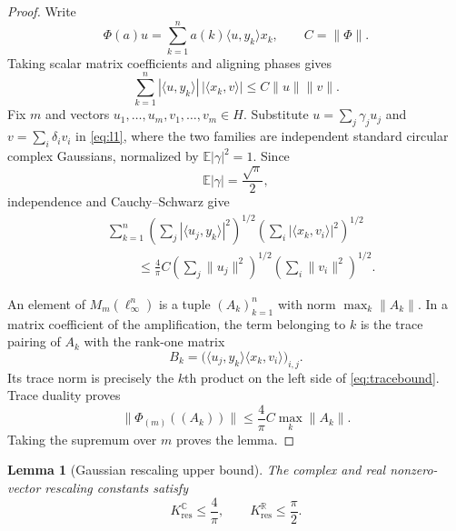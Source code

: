 \documentclass[11pt]{article}
\newtheorem{lemma}{Lemma}
\newcommand{\C}{\mathbb C}
\newcommand{\R}{\mathbb R}
\begin{document}
\begin{proof}
Write
\[
 \Phi(a)u=\sum_{k=1}^n a(k)\langle u,y_k\rangle x_k,
 \qquad C=\|\Phi\|.
\]
Taking scalar matrix coefficients and aligning phases gives
\begin{equation}\label{eq:l1}
 \sum_{k=1}^n
 |\langle u,y_k\rangle|\,|\langle x_k,v\rangle|
 \leq C\|u\|\|v\|.
\end{equation}
Fix $m$ and vectors $u_1,\ldots,u_m,v_1,\ldots,v_m\in H$.  Substitute
$u=\sum_j\gamma_ju_j$ and $v=\sum_i\delta_iv_i$ in \eqref{eq:l1}, where
the two families are independent standard circular complex Gaussians,
normalized by $\mathbb E|\gamma|^2=1$.  Since
\[
 \mathbb E|\gamma|=\frac{\sqrt\pi}{2},
\]
independence and Cauchy--Schwarz give
\begin{align}\label{eq:tracebound}
 &\sum_{k=1}^n
 \left(\sum_j|\langle u_j,y_k\rangle|^2\right)^{1/2}
 \left(\sum_i|\langle x_k,v_i\rangle|^2\right)^{1/2} \\
 &\hspace{1cm}\leq \frac4\pi C
 \left(\sum_j\|u_j\|^2\right)^{1/2}
 \left(\sum_i\|v_i\|^2\right)^{1/2}.
\end{align}

An element of $M_m(\ell_\infty^n)$ is a tuple $(A_k)_{k=1}^n$ with norm
$\max_k\|A_k\|$.  In a matrix coefficient of the amplification, the term
belonging to $k$ is the trace pairing of $A_k$ with the rank-one matrix
\[
 B_k=\big(\langle u_j,y_k\rangle\langle x_k,v_i\rangle\big)_{i,j}.
\]
Its trace norm is precisely the $k$th product on the left side of
\eqref{eq:tracebound}.  Trace duality proves
\[
 \|\Phi_{(m)}((A_k))\|\leq\frac4\pi C\max_k\|A_k\|.
\]
Taking the supremum over $m$ proves the lemma.
\end{proof}

\begin{lemma}[Gaussian rescaling upper bound]\label{lem:resupper}
The complex and real nonzero-vector rescaling constants satisfy
\[
 K_{\mathrm{res}}^{\C}\leq\frac4\pi,
 \qquad
 K_{\mathrm{res}}^{\R}\leq\frac\pi2.
\]
\end{lemma}
\end{document}
